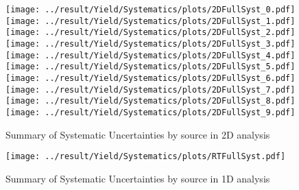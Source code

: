 \begin{figure}
	\centering
		\texttt{[image: ../result/Yield/Systematics/plots/2DFullSyst\_0.pdf]}
		\texttt{[image: ../result/Yield/Systematics/plots/2DFullSyst\_1.pdf]}
		\texttt{[image: ../result/Yield/Systematics/plots/2DFullSyst\_2.pdf]}\\
		\texttt{[image: ../result/Yield/Systematics/plots/2DFullSyst\_3.pdf]}
		\texttt{[image: ../result/Yield/Systematics/plots/2DFullSyst\_4.pdf]}
		\texttt{[image: ../result/Yield/Systematics/plots/2DFullSyst\_5.pdf]}\\
		\texttt{[image: ../result/Yield/Systematics/plots/2DFullSyst\_6.pdf]}
		\texttt{[image: ../result/Yield/Systematics/plots/2DFullSyst\_7.pdf]}
		\texttt{[image: ../result/Yield/Systematics/plots/2DFullSyst\_8.pdf]}\\
		\texttt{[image: ../result/Yield/Systematics/plots/2DFullSyst\_9.pdf]}
		\caption{Summary of Systematic Uncertainties by source in 2D analysis}
		\label{fig:FINAL_SYST_2D}
\end{figure}

\newpage
\begin{figure}
	\centering
		\texttt{[image: ../result/Yield/Systematics/plots/RTFullSyst.pdf]}
		\caption{Summary of Systematic Uncertainties by source in 1D analysis}
		\label{fig:FINAL_SYST_RT}
\end{figure}